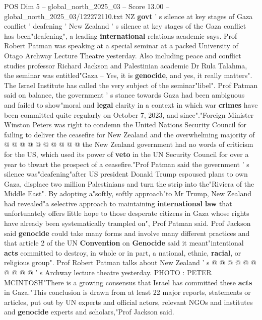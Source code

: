\begin{textsample}{POS Dim 5 – global\_north\_2025\_03 – Score 13.00 – global\_north\_2025\_03/122272110.txt}  \label{ex:f5_pos_207}
NZ \textbf{govt} ' s silence at key stages of Gaza conflict ' deafening ' New Zealand ' s silence at key stages of the Gaza conflict has been"deafening", a leading \textbf{international} relations academic says.
Prof Robert Patman was speaking at a special seminar at a packed University of Otago Archway Lecture Theatre yesterday.
Also including peace and conflict studies professor Richard Jackson and Palestinian academic Dr Rula Talahma, the seminar was entitled"Gaza -- Yes, it is \textbf{genocide}, and yes, it really matters".
The Israel Institute has called the very subject of the seminar"libel".
Prof Patman said on balance, the government ' s stance towards Gaza had been ambiguous and failed to show"moral and \textbf{legal} clarity in a context in which war \textbf{crimes} have been committed quite regularly on October 7, 2023, and since"."Foreign Minister Winston Peters was right to condemn the United Nations Security Council for failing to deliver the ceasefire for New Zealand and the overwhelming majority of @ @ @ @ @ @ @ @ @ @ the New Zealand government had no words of criticism for the US, which used its power of \textbf{veto} in the UN Security Council for over a year to thwart the prospect of a ceasefire."Prof Patman said the government ' s silence was"deafening"after US president Donald Trump espoused plans to own Gaza, displace two million Palestinians and turn the strip into the"Riviera of the Middle East".
By adopting a"softly, softly approach"to Mr Trump, New Zealand had revealed"a selective approach to maintaining \textbf{international} \textbf{law} that unfortunately offers little hope to those desperate citizens in Gaza whose rights have already been systematically trampled on", Prof Patman said.
Prof Jackson said \textbf{genocide} could take many forms and involve many different practices and that article 2 of the UN \textbf{Convention} on \textbf{Genocide} said it meant"intentional \textbf{acts} committed to destroy, in whole or in part, a national, ethnic, \textbf{racial}, or religious group".
Prof Robert Patman talks about New Zealand ' s @ @ @ @ @ @ @ @ @ @ ' s Archway lecture theatre yesterday.
PHOTO : PETER MCINTOSH"There is a growing consensus that Israel has committed these \textbf{acts} in Gaza."This conclusion is drawn from at least 22 major reports, statements or articles, put out by UN experts and official actors, relevant NGOs and institutes and \textbf{genocide} experts and scholars,"Prof Jackson said.

\end{textsample}
